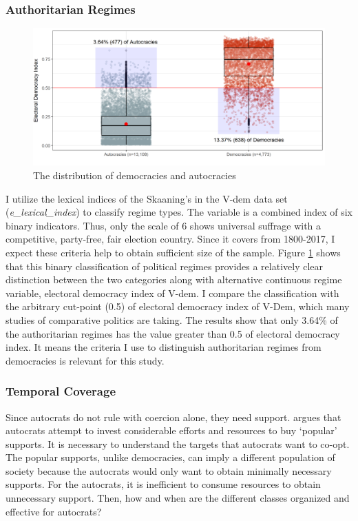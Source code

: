 \documentclass[12pt, letterpage, notitlepage]{article}
\begin{document}
\subsubsection{Authoritarian Regimes}

\begin{figure}[!htbt]
	\centering
	\includegraphics[width=0.85\linewidth]{"2_Figures/Plot1"}
	\caption{The distribution of democracies and autocracies}
	\label{fig:plot1}
\end{figure}

I utilize the lexical indices of the Skaaning's in the V-dem data set (\textit{e\_lexical\_index}) to classify regime types. The variable is a combined index of six binary indicators. Thus, only the scale of 6 shows universal suffrage with a competitive, party-free, fair election country. Since it covers from 1800-2017, I expect these criteria help to obtain sufficient size of the sample. Figure \ref{fig:plot1} shows that this binary classification of political regimes provides a relatively clear distinction between the two categories along with alternative continuous regime variable, electoral democracy index of V-dem. I compare the classification with the arbitrary cut-point (0.5) of electoral democracy index of V-Dem, which many studies of comparative politics are taking. The results show that only 3.64\% of the authoritarian regimes has the value greater than 0.5 of electoral democracy index. It means the criteria I use to distinguish authoritarian regimes from democracies is relevant for this study.\\\par



\subsubsection{Temporal Coverage}

Since autocrats do not rule with coercion alone, they need support. \citet{Cassani2017a} argues that autocrats attempt to invest considerable efforts and resources to buy `popular' supports. It is necessary to understand the targets that autocrats want to co-opt. The popular supports, unlike democracies, can imply a different population of society because the autocrats would only want to obtain minimally necessary supports. For the autocrats, it is inefficient to consume resources to obtain unnecessary support. Then, how and when are the different classes organized and effective for autocrats? 
\end{document}
